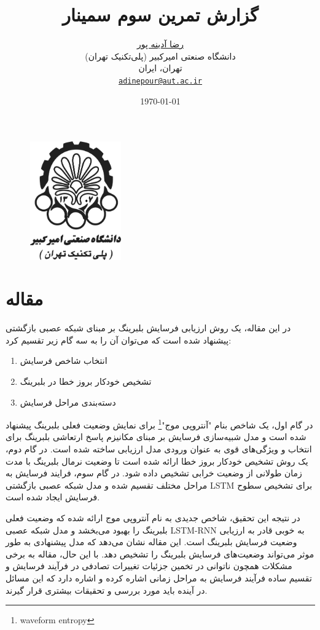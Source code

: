 \documentclass[a4paper,10pt]{article}
\title{\textbf{گزارش تمرین سوم سمینار}}
\author{\href{https://github.com/rezaAdinepour}{رضا آدینه پور}\\
دانشگاه صنعتی امیرکبیر (پلی‌تکنیک تهران) \\
تهران، ایران \\
\texttt{\href{mailto:adinepour@aut.ac.ir}{adinepour@aut.ac.ir}}
}
\date{\today}
\begin{document}
	
	\begin{figure}[t!]
		\centering
		\includegraphics[width=0.35\textwidth]{Logo/aut-fa2.png}
	\end{figure}
	
	\maketitle
	
	
	
	
	
	
	\section{مقاله \textcolor{blue}{\cite{article2}}}
	در این مقاله، یک روش ارزیابی فرسایش بلبرینگ بر مبنای شبکه عصبی بازگشتی  پیشنهاد شده است که می‌توان آن را به سه گام زیر تقسیم کرد:
	
	\begin{enumerate}
		\item انتخاب شاخص فرسایش
		\item تشخیص خودکار بروز خطا در بلبرینگ
		\item دسته‌بندی مراحل فرسایش
	\end{enumerate}

در گام اول، یک شاخص بنام "آنتروپی موج"\footnote{waveform entropy} برای نمایش وضعیت فعلی بلبرینگ پیشنهاد شده است و مدل شبیه‌سازی فرسایش بر مبنای مکانیزم پاسخ ارتعاشی بلبرینگ برای انتخاب و ویژگی‌های قوی به عنوان ورودی مدل ارزیابی ساخته شده است. در گام دوم، یک روش تشخیص خودکار بروز خطا ارائه شده است تا وضعیت نرمال بلبرینگ با مدت زمان طولانی از وضعیت خرابی تشخیص داده شود. در گام سوم، فرایند فرسایش به مراحل مختلف تقسیم شده و مدل شبکه عصبی بازگشتی LSTM برای تشخیص سطوح فرسایش ایجاد شده است.

در نتیجه این تحقیق، شاخص جدیدی به نام آنتروپی موج ارائه شده که وضعیت فعلی بلبرینگ را بهبود می‌بخشد و مدل شبکه عصبی LSTM-RNN به خوبی قادر به ارزیابی وضعیت فرسایش بلبرینگ است. این مقاله نشان می‌دهد که مدل پیشنهادی به طور موثر می‌تواند وضعیت‌های فرسایش بلبرینگ را تشخیص دهد. با این حال، مقاله به برخی مشکلات همچون ناتوانی در تخمین جزئیات تغییرات تصادفی در فرآیند فرسایش و تقسیم ساده فرآیند فرسایش به مراحل زمانی اشاره کرده و اشاره دارد که این مسائل در آینده باید مورد بررسی و تحقیقات بیشتری قرار گیرند.
\end{document}
